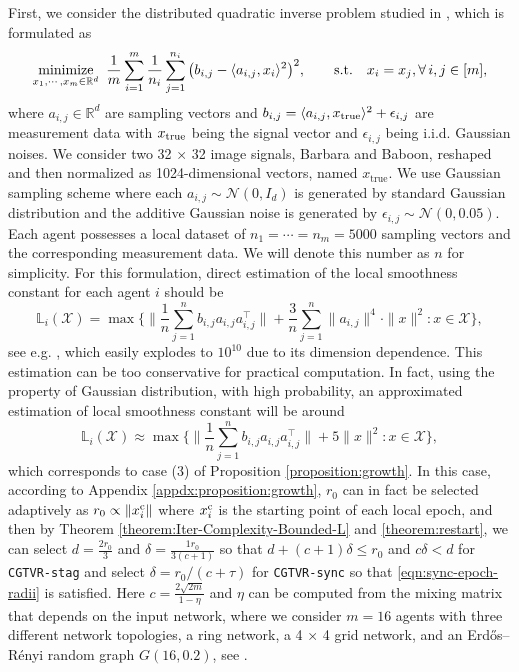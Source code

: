 \documentclass{article}
\newcommand{\cX}{\mathcal{X}}
\newcommand{\bL}{\mathbb{L}}
\newcommand{\RR}{\mathbb{R}}
\newcommand{\st}{\mathrm{s.t.}}
\begin{document}
First, we consider the distributed quadratic inverse problem studied in \cite{zhao2018distributed}, which is formulated as 
\begin{equation}
\label{eq:quardratic inverse}
\mathop{\rm minimize}_{{x}_1,\cdots, {x}_m \in\RR^d}\,\, \frac{1}{m}\sum_{i=1}^{m}\frac{1}{n_i}\sum_{j=1}^{n_i} \big(b_{i,j}-\langle a_{i,j},x_i\rangle^2\big)^2,  \qquad \st \quad x_i = x_j, \forall\, i,j\in[m],
\end{equation}
where $a_{i,j}\in\RR^d$ are sampling vectors and $b_{i,j}=\langle a_{i,j}, {x}_{\rm true}\rangle^2+\epsilon_{i,j}$ are measurement data  with ${x}_{\rm true}$ being the signal vector and $\epsilon_{i,j}$ being i.i.d. Gaussian noises.  We consider two 32 × 32 image signals, Barbara and Baboon, reshaped and then normalized as  1024-dimensional vectors, named $x_{\text{true}}$. We use Gaussian sampling scheme \cite{candes2015phase} where each $a_{i,j}\sim \mathcal{N}(0,I_d)$ is generated by standard Gaussian distribution and the additive Gaussian noise is generated by $\epsilon_{i,j}\sim \mathcal{N}(0,0.05)$. Each agent possesses a local dataset of $n_1 =\cdots=n_m=5000$ sampling vectors and the corresponding measurement data. We will denote this number as $n$ for simplicity. For this formulation, 
direct estimation of the local smoothness constant for each agent $i$ should be 
$$\bL_i(\cX) = \max\bigg\{\Big\|\frac{1}{n}\sum_{j=1}^n b_{i,j}a_{i,j}a_{i,j}^\top\Big\| + \frac{3}{n}\sum_{j=1}^n\|a_{i,j}\|^4\cdot\|x\|^2:x\in\cX\bigg\},$$
see e.g. \cite{bolte2018first}, which easily explodes to $10^{10}$ due to its dimension dependence. This estimation can be too conservative for practical computation. In fact, using the property of Gaussian distribution, with high probability, an approximated estimation of local smoothness constant will be around
$$\bL_i(\cX) \approx \max\bigg\{\Big\|\frac{1}{n}\sum_{j=1}^n b_{i,j}a_{i,j}a_{i,j}^\top\Big\| + 5\|x\|^2: x\in\cX\bigg\},$$
which corresponds to case (3) of Proposition \ref{proposition:growth}. In this case, according to Appendix \ref{appdx:proposition:growth}, $r_0$ can in fact be selected adaptively as $r_0\propto\|x^{\rm c}_i\|$ where $x^{\rm c}_i$ is the starting point of each local epoch, and then by Theorem \ref{theorem:Iter-Complexity-Bounded-L} and \ref{theorem:restart}, we can select $d = \frac{2r_0}{3}$ and $\delta = \frac{1r_0}{3(c+1)}$ so that $d+(c+1)\delta\le r_0$ and $c\delta<d$ for \texttt{CGTVR-stag} and select $\delta=r_0/(c+\tau)$ for \texttt{CGTVR-sync} so that \eqref{eqn:sync-epoch-radii} is satisfied. Here $c = \frac{2\sqrt{2m}}{1-\eta}$ and $\eta$ can be computed from the mixing matrix that depends on the input network, where we consider $m=16$ agents with three different network topologies, a ring network, a 4 × 4 grid network, and an Erdős–Rényi random graph $G(16,0.2)$, see \cite{renyi1959random}.
\end{document}
